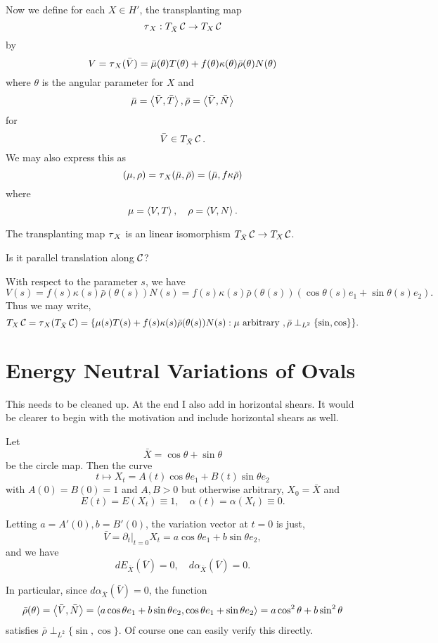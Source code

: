 \documentclass[12pt]{article}
\begin{document}
Now we define for each \(X \in H'\), the transplanting map
\[
\operatorname{\tau}_X : T_{\bar{X}} \operatorname{\mathcal{C}} \to T_X \operatorname{\mathcal{C}}
\]
by
\[
V = \operatorname{\tau}_X(\bar{V}) = \bar{\mu}(\theta) T(\theta) + f(\theta)\kappa(\theta)\bar{\rho}(\theta) N(\theta)
\]
where \(\theta\) is the angular parameter for \(X\) and
\[
\bar{\mu} = \left\langle{\bar{V}},{\bar{T}}\right\rangle, \bar{\rho} = \left\langle{\bar{V}},{\bar{N}}\right\rangle
\]
for
\[
\bar{V} \in T_{\bar{X}} \operatorname{\mathcal{C}}.
\]
We may also express this as
\[
(\mu, \rho) = \operatorname{\tau}_X(\bar{\mu}, \bar{\rho}) = (\bar{\mu}, f\kappa\bar{\rho})
\]
where
\[
\mu = \left\langle{V},{T}\right\rangle, \quad \rho = \left\langle{V},{N}\right\rangle.
\]

The transplanting map \(\operatorname{\tau}_X\) is an linear isomorphism \(T_{\bar{X}} \operatorname{\mathcal{C}} \to T_X \operatorname{\mathcal{C}}\).

{\color{red} Is it parallel translation along \(\operatorname{\mathcal{C}}\)?}

With respect to the parameter \(s\), we have
\[
V(s) = f(s) \kappa(s) \bar{\rho}(\theta(s)) N(s) = f(s) \kappa(s) \bar{\rho}(\theta(s))(\cos\theta(s) e_1 + \sin\theta(s) e_2).
\]
Thus we may write,
\[
T_X \operatorname{\mathcal{C}} = \operatorname{\tau}_X(T_{\bar{X}} \operatorname{\mathcal{C}}) = \{\mu(s) T(s) + f(s) \kappa(s) \bar{\rho}(\theta(s)) N(s) : \mu \text{ arbitrary }, \bar{\rho} \perp_{L^2} \{\sin, \cos\}\}.
\]

\section{Energy Neutral Variations of Ovals}

{\color{red} This needs to be cleaned up. At the end I also add in horizontal shears. It would be clearer to begin with the motivation and include horizontal shears as well.}

Let
\[
\bar{X} = \cos\theta + \sin \theta
\]
be the circle map. Then the curve
\[
t \mapsto X_t = A(t) \cos\theta e_1 + B(t) \sin \theta e_2
\]
with \(A(0) = B(0) = 1\) and \(A, B > 0\) but otherwise arbitrary, \(X_0 = \bar{X}\) and
\[
E(t) = E(X_t) \equiv 1, \quad \alpha(t) = \alpha(X_t) \equiv 0.
\]

Letting \(a = A'(0), b = B'(0)\), the variation vector at \(t = 0\) is just,
\[
\bar{V} = \partial_t|_{t=0} X_t = a \cos\theta e_1 + b \sin\theta e_2,
\]
and we have
\[
dE_{\bar{X}} (\bar{V}) = 0, \quad d\alpha_{\bar{X}} (\bar{V}) = 0.
\]

In particular, since \(d\alpha_{\bar{X}} (\bar{V}) = 0\), the function
\[
\bar{\rho} (\theta) = \left\langle{\bar{V}},{\bar{N}}\right\rangle = \left\langle{a \cos\theta e_1 + b \sin\theta e_2},{\cos\theta e_1 + \sin\theta e_2}\right\rangle = a \cos^2\theta + b \sin^2\theta
\]
satisfies \(\bar{\rho} \perp_{L^2} \{\sin, \cos\}\). Of course one can easily verify this directly.
\end{document}
